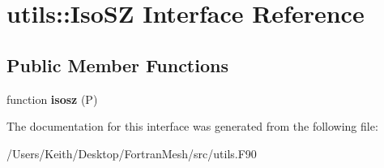 \hypertarget{interfaceutils_1_1_iso_s_z}{}\section{utils\+:\+:Iso\+SZ Interface Reference}
\label{interfaceutils_1_1_iso_s_z}
\subsection*{Public Member Functions}
\begin{DoxyCompactItemize}
\item 
function {\bfseries isosz} (P)\hypertarget{interfaceutils_1_1_iso_s_z_ad83af95f91decc456f371b9a8ddc6ea6}{}\label{interfaceutils_1_1_iso_s_z_ad83af95f91decc456f371b9a8ddc6ea6}

\end{DoxyCompactItemize}


The documentation for this interface was generated from the following file\+:\begin{DoxyCompactItemize}
\item 
/\+Users/\+Keith/\+Desktop/\+Fortran\+Mesh/src/utils.\+F90\end{DoxyCompactItemize}
